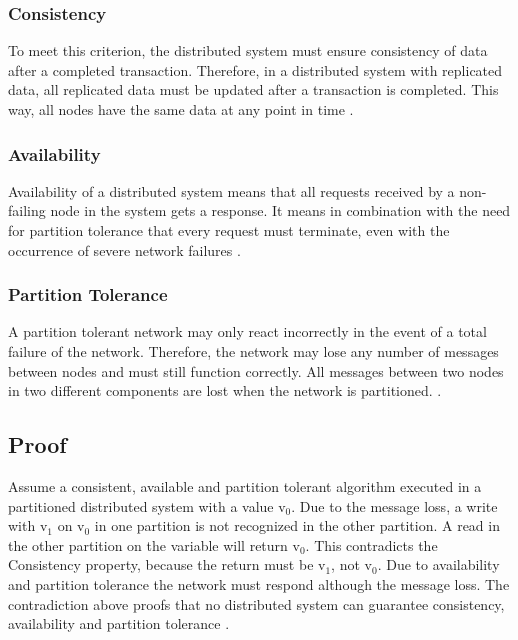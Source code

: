 \subsubsection*{Consistency}

To meet this criterion, the distributed system must ensure consistency of data after a completed transaction. Therefore, in a distributed system with replicated data, all replicated data must be updated after a transaction is completed. This way, all nodes have the same data at any point in time \parencite[2\psqq]{brewer:2002}.

\subsubsection*{Availability}

Availability of a distributed system means that all requests received by a non-failing node in the system gets a response. It means in combination with the need for partition tolerance that every request must terminate, even with the occurrence of severe network failures \parencite[3]{brewer:2002}.

\subsubsection*{Partition Tolerance}

A partition tolerant network may only react incorrectly in the event of a total failure of the network. Therefore, the network may lose any number of messages between nodes and must still function correctly. All messages between two nodes in two different components are lost when the network is partitioned. \parencite[3\psqq]{brewer:2002}.

\subsection{Proof}

Assume a consistent, available and partition tolerant algorithm executed in a partitioned distributed system with a value v$_{0}$. Due to the message loss, a write with v$_{1}$ on v$_{0}$ in one partition is not recognized in the other partition. A read in the other partition on the variable will return v$_{0}$. This contradicts the Consistency property, because the return must be v$_{1}$, not v$_{0}$. Due to availability and partition tolerance the network must respond although the message loss. The contradiction above proofs that no distributed system can guarantee consistency, availability and partition tolerance \parencite[4\psqq]{brewer:2002}.

